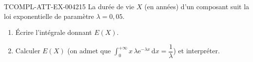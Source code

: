 \begin{exercice}{TCOMPL-ATT-EX-004}{2}{15}
La durée de vie $X$ (en années) d'un composant suit la loi exponentielle de paramètre $\lambda=0{,}05$.
\begin{enumerate}
  \item Écrire l'intégrale donnant $E(X)$.
  \item Calculer $E(X)$ (on admet que $\displaystyle\int_0^{+\infty} x\,\lambda\mathrm{e}^{-\lambda x}\,\mathrm{d}x = \dfrac{1}{\lambda}$) et interpréter.
\end{enumerate}
\end{exercice}
